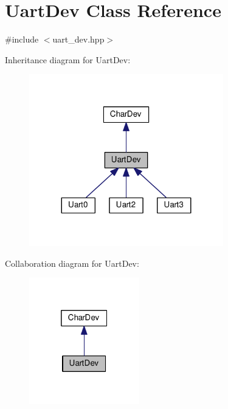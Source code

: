 \hypertarget{classUartDev}{}\section{Uart\+Dev Class Reference}
\label{classUartDev}


{\ttfamily \#include $<$uart\+\_\+dev.\+hpp$>$}



Inheritance diagram for Uart\+Dev\+:\nopagebreak
\begin{figure}[H]
\begin{center}
\leavevmode
\includegraphics[width=239pt]{da/d4c/classUartDev__inherit__graph}
\end{center}
\end{figure}


Collaboration diagram for Uart\+Dev\+:\nopagebreak
\begin{figure}[H]
\begin{center}
\leavevmode
\includegraphics[width=136pt]{df/d31/classUartDev__coll__graph}
\end{center}
\end{figure}
